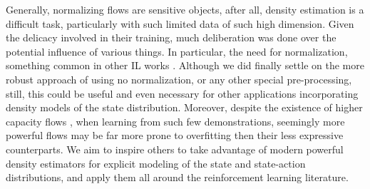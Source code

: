 Generally, normalizing flows are sensitive objects, after all, density estimation is a difficult task, particularly with such limited data of such high dimension. Given the delicacy involved in their training, much deliberation was done over the potential influence of various things. In particular, the need for normalization, something common in other IL works \cite{kostrikov2018discriminator,kostrikov2019imitation,schroecker2020universal}. Although we did finally settle on the more robust approach of using no normalization, or any other special pre-processing, still, this could be useful and even necessary for other applications incorporating density models of the state distribution. Moreover, despite the existence of higher capacity flows \cite{kingma2018glow,huang2018neural,durkan2019neural,ho2019flow++}, when learning from such few demonstrations, seemingly more powerful flows may be far more prone to overfitting then their less expressive counterparts. We aim to inspire others to take advantage of modern powerful density estimators for explicit modeling of the state and state-action distributions, and apply them all around the reinforcement learning literature.
